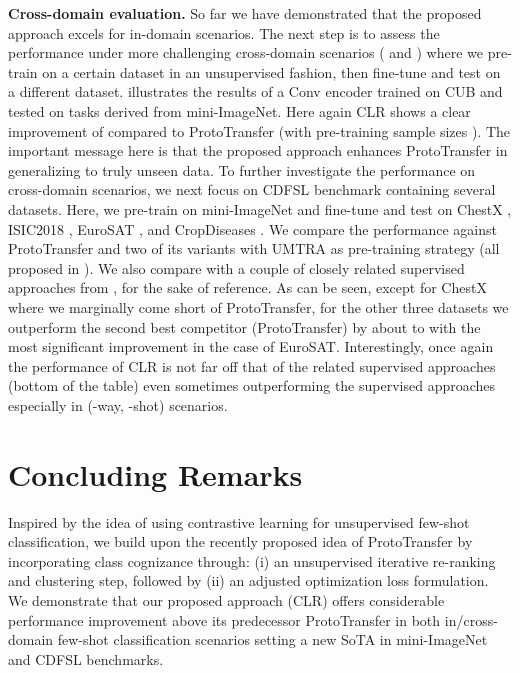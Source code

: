 \documentclass{article}
\begin{document}
\textbf{Cross-domain evaluation.} So far we have demonstrated that the proposed approach excels for in-domain scenarios. The next step is to assess the performance under more challenging cross-domain scenarios ( and ) where we pre-train on a certain dataset in an unsupervised fashion, then fine-tune and test on a different dataset.  illustrates the results of a Conv encoder trained on CUB and tested on tasks derived from mini-ImageNet. Here again CLR shows a clear improvement of  compared to ProtoTransfer (with pre-training sample sizes ). The important message here is that the proposed approach enhances ProtoTransfer in generalizing to truly unseen data. To further investigate the performance on cross-domain scenarios, we next focus on CDFSL benchmark \citep{guo2019new} containing several datasets. Here, we pre-train on mini-ImageNet and fine-tune and test on ChestX \citep{wang2017chestx}, ISIC2018 \citep{isic2018dataset}, EuroSAT \citep{helber2017eurosat}, and CropDiseases \citep{mohanty2016using}. We compare the performance against ProtoTransfer and two of its variants with UMTRA \citep{Khodadadeh2018UnsupervisedClassification} as pre-training strategy (all proposed in \citep{Medina2020Self-SupervisedClassification}). We also compare with a couple of closely related supervised approaches from \citep{guo2019new}, for the sake of reference. As can be seen, except for ChestX where we marginally come short of ProtoTransfer, for the other three datasets we outperform the second best competitor (ProtoTransfer) by about  to  with the most significant improvement in the case of EuroSAT. Interestingly, once again the performance of CLR is not far off that of the related supervised approaches (bottom of the table) even sometimes outperforming the supervised approaches especially in (-way, -shot) scenarios.


\section{Concluding Remarks}\label{sec:conclusion}

Inspired by the idea of using contrastive learning for unsupervised few-shot classification, we build upon the recently proposed idea of ProtoTransfer \citep{Medina2020Self-SupervisedClassification} by incorporating class cognizance through: (i) an unsupervised iterative re-ranking and clustering step, followed by (ii) an adjusted optimization loss formulation. We demonstrate that our proposed approach (CLR) offers considerable performance improvement above its predecessor ProtoTransfer in both in/cross-domain few-shot classification scenarios setting a new SoTA in mini-ImageNet and CDFSL benchmarks.  



  
\end{document}
